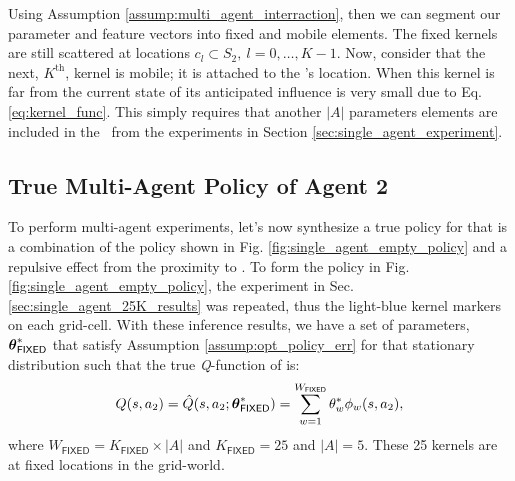     Using Assumption \ref{assump:multi_agent_interraction}, then we can segment our parameter and feature vectors into
    fixed and mobile elements. The fixed kernels are still scattered at locations $c_l \subset S_2,\ l=0,\ldots,K-1$.
    Now, consider that the next, $K^{\text{th}}$, kernel is mobile; it is attached to the \!'s location. When
    this kernel is far from the current state of  its anticipated influence is very small due to Eq.
    \ref{eq:kernel_func}. This simply requires that another $|A|$ parameters elements are included in the \paramVec\
    from the experiments in Section \ref{sec:single_agent_experiment}.


\subsection{True Multi-Agent Policy of Agent 2} \label{sec:true_agent_2_multi_agent_policy}

    \begin{figure}[htb]
        \begin{center}
        \end{center}
    \end{figure}

    To perform multi-agent experiments, let's now synthesize a true policy for  that is a combination of the
    policy shown in Fig. \ref{fig:single_agent_empty_policy} and a repulsive effect from the proximity to \agent{1}. To
    form the policy in Fig. \ref{fig:single_agent_empty_policy}, the experiment in Sec.
    \ref{sec:single_agent_25K_results} was repeated, thus the light-blue kernel markers on each grid-cell. With these
    inference results, we have a set of parameters, $\boldsymbol{\mathbb{\theta}}^*_{\mathsf{FIXED}}$ that satisfy Assumption
    \ref{assump:opt_policy_err} for that stationary distribution such that the true \emph{Q}-function of \agent{2} is:
    \[
        Q(s,a_2) = \hat{Q}(s,a_2; \boldsymbol{\mathbb{\theta}}^*_{\mathsf{FIXED}})
                 = \sum_{w=1}^{W_{\mathsf{FIXED}}} \theta^*_{w} \phi_{w}(s,a_2),
    \]
    where $W_{\mathsf{FIXED}}=K_{\mathsf{FIXED}}\times |A|$ and $K_{\mathsf{FIXED}}=25$ and $|A|=5$. These 25 kernels
    are at fixed locations in the grid-world.

